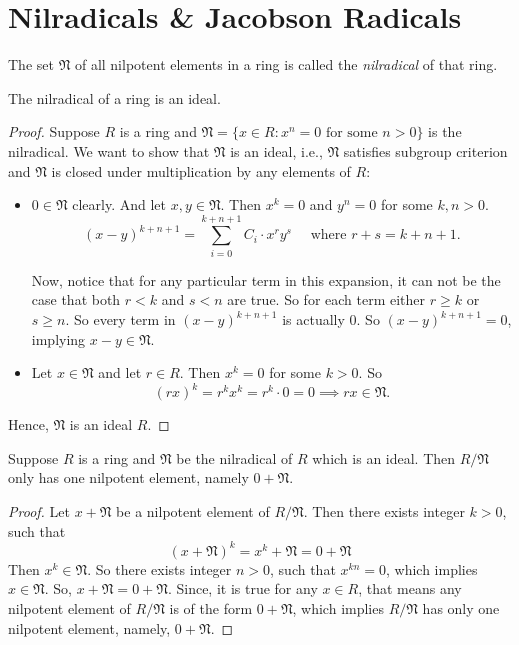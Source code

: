 \section{Nilradicals \& Jacobson Radicals}
\begin{definition}[Nilradical]
    The set \(\mathfrak{N}\) of all nilpotent elements in a ring is called the \emph{nilradical} of that ring.
\end{definition}
\begin{proposition}
    The nilradical of a ring is an ideal.
\end{proposition}
\begin{proof}
    Suppose \(R\) is a ring and \(\mathfrak{N} = \{x \in R : x^n=0 \text{ for some } n > 0\}\) is the nilradical. We want to show that \(\mathfrak{N}\) is an ideal, i.e., \(\mathfrak{N}\) satisfies subgroup criterion and \(\mathfrak{N}\) is closed under multiplication by any elements of \(R\):

    \begin{itemize}
        \item \(0 \in \mathfrak{N}\) clearly. And let \(x, y \in \mathfrak{N}\). Then \(x^k = 0\) and \(y^n = 0\) for some \(k, n > 0\). 
            \[(x-y)^{k+n+1} = \sum_{i = 0}^{k+n+1}C_i \cdot x^r y^s \quad\text{ where } r+s = k + n + 1.\]

            Now, notice that for any particular term in this expansion, it can not be the case that both \(r < k\) and \(s < n\) are true. So for each term either \(r \ge k\) or \(s \ge n\). So every term in \((x-y)^{k+n+1}\) is actually \(0\). So \((x-y)^{k+n+1} = 0\), implying \(x - y \in \mathfrak{N}\).
        \item Let \(x \in \mathfrak{N}\) and let \(r \in R\). Then \(x^k = 0\) for some \(k > 0\). So \[(rx)^k = r^kx^k = r^k \cdot 0 = 0 \implies rx \in \mathfrak{N}.\]
    \end{itemize}
    Hence, \(\mathfrak{N}\) is an ideal \(R\).
\end{proof}
\begin{lemma}
    Suppose \(R\) is a ring and \(\mathfrak{N}\) be the nilradical of \(R\) which is an ideal. Then \(R/\mathfrak{N}\) only has one nilpotent element, namely \(0 + \mathfrak{N}\).
\end{lemma}
\begin{proof}
    Let \(x + \mathfrak{N}\) be a nilpotent element of \(R/\mathfrak{N}\). Then there exists integer \(k > 0\), such that 
    \[
        \left(x + \mathfrak{N}\right)^k = x^k + \mathfrak{N} = 0 + \mathfrak{N}
    \]
    Then \(x^k \in \mathfrak{N}\). So there exists integer \(n > 0\), such that  \(x^{kn} = 0\), which implies  \(x \in \mathfrak{N}\). So, \(x + \mathfrak{N} = 0 + \mathfrak{N}\). Since, it is true for any \(x \in R\), that means any nilpotent element of \(R/\mathfrak{N}\) is of the form \(0 + \mathfrak{N}\), which implies \(R/\mathfrak{N}\) has only one nilpotent element, namely, \(0 + \mathfrak{N}\).
\end{proof}
